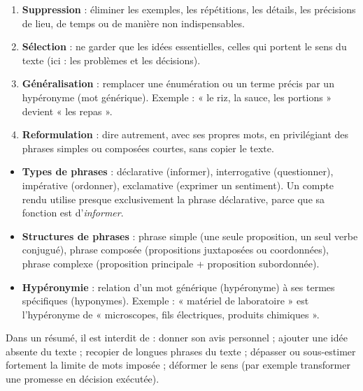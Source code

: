 \documentclass[11pt]{article}
\newcommand{\cle}[1]{{\popxbold\color{popdark}#1}}
\begin{document}
\begin{aretenir}
\begin{enumerate}
\item \textbf{Suppression} : éliminer les exemples, les répétitions, les détails, les précisions de lieu, de temps ou de manière non indispensables.
\item \textbf{Sélection} : ne garder que les idées essentielles, celles qui portent le sens du texte (ici : les problèmes et les décisions).
\item \textbf{Généralisation} : remplacer une énumération ou un terme précis par un \cle{hypéronyme} (mot générique). Exemple : « le riz, la sauce, les portions » devient « les repas ».
\item \textbf{Reformulation} : dire autrement, avec ses propres mots, en privilégiant des phrases simples ou composées courtes, sans copier le texte.
\end{enumerate}
\end{aretenir}

\begin{aretenir}
\begin{itemize}
\item \textbf{Types de phrases} : déclarative (informer), interrogative (questionner), impérative (ordonner), exclamative (exprimer un sentiment). Un compte rendu utilise presque exclusivement la phrase \cle{déclarative}, parce que sa fonction est d'\emph{informer}.
\item \textbf{Structures de phrases} : phrase \cle{simple} (une seule proposition, un seul verbe conjugué), phrase \cle{composée} (propositions juxtaposées ou coordonnées), phrase \cle{complexe} (proposition principale + proposition subordonnée).
\item \textbf{Hypéronymie} : relation d'un mot générique (\cle{hypéronyme}) à ses termes spécifiques (\cle{hyponymes}). Exemple : « matériel de laboratoire » est l'hypéronyme de « microscopes, fils électriques, produits chimiques ».
\end{itemize}
\end{aretenir}

\begin{attention}
Dans un résumé, il est interdit de : donner son avis personnel ; ajouter une idée absente du texte ; recopier de longues phrases du texte ; dépasser ou sous-estimer fortement la limite de mots imposée ; déformer le sens (par exemple transformer une promesse en décision exécutée).
\end{attention}
\end{document}
